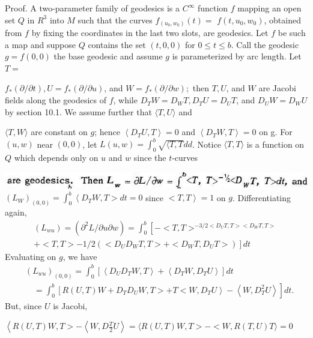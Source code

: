 \documentclass[10pt]{article}
\begin{document}
Proof. A two-parameter family of geodesics is a $C^{\infty}$ function $f$ mapping an open set $Q$ in $R^{3}$ into $M$ such that the curves $f_{\left(u_{0}, w_{0}\right)}(t)=$ $f\left(t, u_{0}, w_{0}\right)$, obtained from $f$ by fixing the coordinates in the last two slots, are geodesics. Let $f$ be such a map and suppose $Q$ contains the set $(t, 0,0)$ for $0 \leq t \leq b$. Call the geodesic $g=f(0,0)$ the base geodesic and assume $g$ is parameterized by arc length. Let $T=$

$f_{*}(\partial / \partial t), U=f_{*}(\partial / \partial u)$, and $W=f_{*}(\partial / \partial w) ;$ then $T, U$, and $W$ are Jacobi fields along the geodesics of $f$, while $D_{T} W=D_{W} T, D_{T} U=D_{U} T$, and $D_{U} W=D_{W} U$ by section 10.1. We assume further that $\langle T, U\rangle$ and

$\langle T, W\rangle$ are constant on $g$; hence $\left\langle D_{T} U, T\right\rangle=0$ and $\left\langle D_{T} W, T\right\rangle=0$ on g. For $(u, w)$ near $(0,0)$, let $L(u, w)=\int_{0}^{b} \sqrt{\langle T, T} d d$. Notice $\langle T, T\rangle$ is a function on $Q$ which depends only on $u$ and $w$ since the $t$-curves

\includegraphics[max width=\textwidth]{2022_07_16_f4e476ee2159dc67e746g-83(1)}\\
$\left(L_{W}\right)_{(0,0)}=\int_{0}^{b}\left\langle D_{T} W, T>d t=0\right.$ since $\left.<T, T\right\rangle=1$ on $g$. Differentiating again,
$$
\begin{gathered}
\left(L_{w u}\right)=\left(\partial^{2} L / \partial u \partial w\right)=\int_{0}^{b}\left[-<T, T>^{-3 / 2<D_{U} T, T><D_{W} T, T>}\right. \\
\left.+<T, T>-1 / 2\left(<D_{U} D_{W} T, T>+<D_{W} T, D_{U} T>\right)\right] d t
\end{gathered}
$$
Evaluating on $g$, we have
$$
\begin{aligned}
&\left(L_{w u}\right)_{(0,0)}=\int_{0}^{b}\left[\left\langle D_{U} D_{T} W, T\right\rangle+\left\langle D_{T} W, D_{T} U\right\rangle\right] d t \\
&\left.\quad=\int_{0}^{b}\left[R(U, T) W+D_{T} D_{U} W, T>+T<W, D_{T} U\right\rangle-\left\langle W, D_{T}^{2} U\right\rangle\right] d t .
\end{aligned}
$$
But, since $U$ is Jacobi,

$\left\langle R(U, T) W, T>-\left\langle W, D \frac{T}{2} U\right\rangle=\langle R(U, T) W, T>-<W, R(T, U) T\rangle=0\right.$
\end{document}
